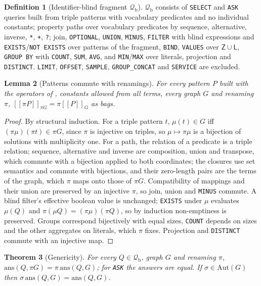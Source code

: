 \documentclass[11pt,twocolumn,a4paper]{article}
\theoremstyle{plain}
\newtheorem{theorem}{Theorem}[section]
\newtheorem{lemma}[theorem]{Lemma}
\theoremstyle{definition}
\newtheorem{definition}[theorem]{Definition}
\theoremstyle{remark}
\newcommand{\G}{G}
\newcommand{\Zset}{\mathsf{Z}}
\newcommand{\Lset}{\mathsf{L}}
\newcommand{\Qfrag}{\mathcal{Q}_{\mathrm{b}}}
\newcommand{\ans}{\mathrm{ans}}
\newcommand{\Aut}{\mathrm{Aut}}
\begin{document}
\begin{definition}[Identifier-blind fragment $\Qfrag$]
\label{def:frag}
$\Qfrag$ consists of \texttt{SELECT} and \texttt{ASK} queries built from triple
patterns with vocabulary predicates and no individual constants; property paths
over vocabulary predicates by sequence, alternative, inverse, \texttt{*},
\texttt{+}, \texttt{?}; join, \texttt{OPTIONAL}, \texttt{UNION},
\texttt{MINUS}, \texttt{FILTER} with blind expressions and
\texttt{EXISTS}/\texttt{NOT EXISTS} over patterns of the fragment,
\texttt{BIND}, \texttt{VALUES} over $\Zset\cup\Lset$, \texttt{GROUP BY} with
\texttt{COUNT}, \texttt{SUM}, \texttt{AVG}, and \texttt{MIN}/\texttt{MAX} over
literals, projection and \texttt{DISTINCT}. \texttt{LIMIT}, \texttt{OFFSET},
\texttt{SAMPLE}, \texttt{GROUP\_CONCAT} and \texttt{SERVICE} are excluded.
\end{definition}

\begin{lemma}[Patterns commute with renamings]
\label{lem:pattern}
For every pattern $P$ built with the operators of , constants
allowed from all terms, every graph $\G$ and renaming $\pi$,
$[\![\pi P]\!]_{\pi\G}=\pi[\![P]\!]_\G$ as bags.
\end{lemma}

\begin{proof}
By structural induction. For a triple pattern $t$, $\mu(t)\in\G$ iff
$(\pi\mu)(\pi t)\in\pi\G$, since $\pi$ is injective on triples, so
$\mu\mapsto\pi\mu$ is a bijection of solutions with multiplicity one. For a path,
the relation of a predicate is a triple relation; sequence, alternative and
inverse are composition, union and transpose, which commute with a bijection
applied to both coordinates; the closures use set semantics and commute with
bijections, and their zero-length pairs are the terms of the graph, which
$\pi$ maps onto those of $\pi\G$. Compatibility of mappings and their union are
preserved by an injective $\pi$, so join, union and \texttt{MINUS} commute. A
blind filter's effective boolean value is unchanged; \texttt{EXISTS} under
$\mu$ evaluates $\mu(Q)$ and $\pi(\mu Q)=(\pi\mu)(\pi Q)$, so by induction
non-emptiness is preserved. Groups correspond bijectively with equal sizes,
\texttt{COUNT} depends on sizes and the other aggregates on literals, which
$\pi$ fixes. Projection and \texttt{DISTINCT} commute with an injective map.
\end{proof}

\begin{theorem}[Genericity]
\label{thm:generic}
For every $Q\in\Qfrag$, graph $\G$ and renaming $\pi$,
$\ans(Q,\pi\G)=\pi\,\ans(Q,\G)$; for \texttt{ASK} the answers are equal. If
$\sigma\in\Aut(\G)$ then $\sigma\,\ans(Q,\G)=\ans(Q,\G)$.
\end{theorem}
\end{document}
